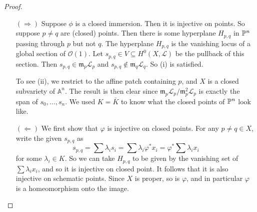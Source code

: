\documentclass[a4paper]{article}
\newcommand\A{\mathbb{A}}
\begin{document}
\begin{proof}\leavevmode
  \begin{itemize}
    \item[$(\Rightarrow)$] Suppose $\phi$ is a closed immersion. Then it is injective on points. So suppose $p \not= q$ are (closed) points. Then there is some hyperplane $H_{p, q}$ in $\P^n$ passing through $p$ but not $q$. The hyperplane $H_{p, q}$ is the vanishing locus of a global section of $\mathcal{O}(1)$. Let $s_{p, q} \in V \subseteq H^0(X, \mathcal{L})$ be the pullback of this section. Then $s_{p, q} \in \mathfrak{m}_p \mathcal{L}_p$ and $s_{p, q} \not \in \mathfrak{m}_q \mathcal{L}_q$. So (i) is satisfied.

      To see (ii), we restrict to the affine patch containing $p$, and $X$ is a closed subvariety of $\A^n$. The result is then clear since $\mathfrak{m}_p\mathcal{L}_p/\mathfrak{m}_p^2\mathcal{L}_p$ is exactly the span of $s_0, \ldots, s_n$. We used $K = \bar{K}$ to know what the closed points of $\P^n$ look like.

    \item[$(\Leftarrow)$] We first show that $\varphi$ is injective on closed points. For any $p \not= q \in X$, write the given $s_{p, q}$ as
      \[
        s_{p, q} = \sum \lambda_i s_i = \sum \lambda_i \varphi^* x_i = \varphi^* \sum \lambda_i x_i
      \]
      for some $\lambda_i \in K$. So we can take $H_{p, q}$ to be given by the vanishing set of $\sum \lambda_i x_i$, and so it is injective on closed point. It follows that it is also injective on schematic points. Since $X$ is proper, so is $\varphi$, and in particular $\varphi$ is a homeomorphism onto the image.


\end{itemize}
\end{proof}
\end{document}
